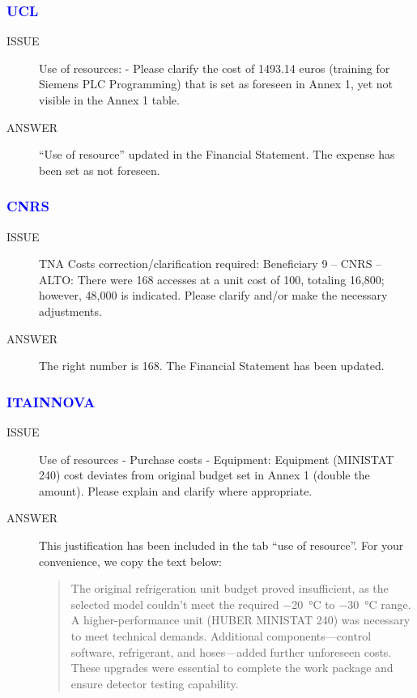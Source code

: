 \begin{prtwo}
\subsubsection*{\textcolor{blue}{UCL}}
\begin{description}
    \item[ISSUE] Use of resources:
- Please clarify the cost of 1493.14 euros (training for Siemens PLC Programming) that is set as foreseen in Annex 1, yet not visible in the Annex 1 table.


    \item[ANSWER] “Use of resource” updated in the Financial Statement. The expense has been set as not foreseen.
\end{description}
\end{prtwo}

\begin{prtwo}
\subsubsection*{\textcolor{blue}{CNRS}}
\begin{description}
    \item[ISSUE] TNA Costs correction/clarification required:
Beneficiary 9 – CNRS – ALTO: There were 168 accesses at a unit cost of 100, totaling 16,800; however, 48,000 is indicated. Please clarify and/or make the necessary adjustments.

    \item[ANSWER] The right number is 168. The Financial Statement has been updated.
\end{description}
\end{prtwo}

\begin{prtwo}
\subsubsection*{\textcolor{blue}{ITAINNOVA}}
\begin{description}
    \item[ISSUE] Use of resources - Purchase costs - Equipment:
Equipment (MINISTAT 240) cost deviates from original budget set in Annex 1 (double the amount). Please explain and clarify where appropriate.

    \item[ANSWER] This justification has been included in the tab “use of resource”. 
For your convenience, we copy the text below:
\begin{quote}
    The original refrigeration unit budget proved insufficient, as the selected model couldn’t meet the required \SI{-20}{\celsius} to \SI{-30}{\celsius} range. A higher-performance unit (HUBER MINISTAT 240) was necessary to meet technical demands. Additional components—control software, refrigerant, and hoses—added further unforeseen costs. These upgrades were essential to complete the work package and ensure detector testing capability.
\end{quote}
\end{description}
\end{prtwo}

